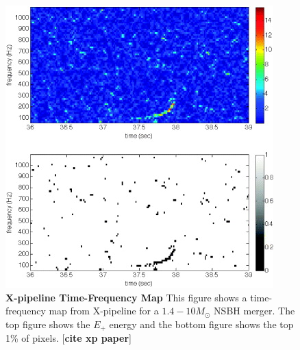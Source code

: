 \documentclass[11pt]{cuthesis}
\newcommand{\xp}{X-pipeline }
\begin{document}
\begin{figure} %
\begin{center}
\includegraphics[width=0.8\linewidth]{xpipelineTFmap.jpg}
\end{center}
\caption{\textbf{\xp Time-Frequency Map} This figure shows a time-frequency map from \xp for a $1.4-10 M_\odot$ NSBH merger. The top figure shows the $E_+$ energy and the bottom figure shows the top 1\% of pixels. [\textbf{cite xp paper}] } 
\label{fig:tfmap}
\end{figure}
\end{document}
